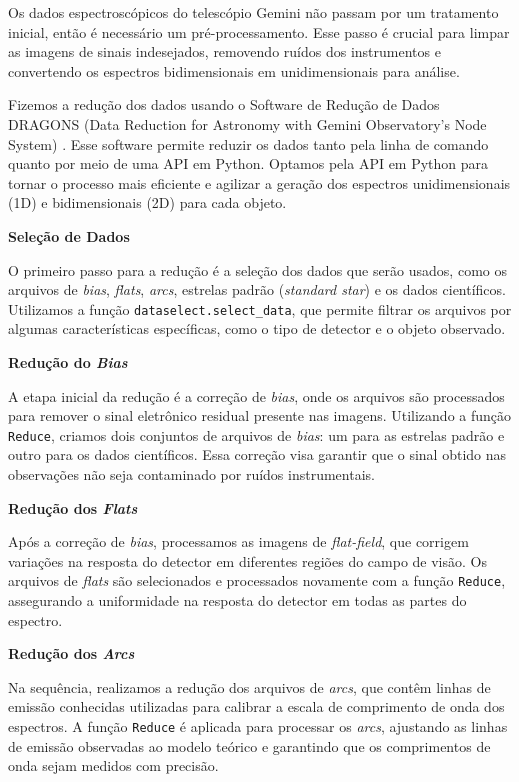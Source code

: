 Os dados espectroscópicos do telescópio Gemini não passam por um tratamento inicial, então é necessário um pré-processamento. Esse passo é crucial para limpar as imagens de sinais indesejados, removendo ruídos dos instrumentos e convertendo os espectros bidimensionais em unidimensionais para análise.

Fizemos a redução dos dados usando o Software de Redução de Dados DRAGONS (Data Reduction for Astronomy with Gemini Observatory's Node System) \cite{dragons_python}. Esse software permite reduzir os dados tanto pela linha de comando quanto por meio de uma API em Python. Optamos pela API em Python para tornar o processo mais eficiente e agilizar a geração dos espectros unidimensionais (1D) e bidimensionais (2D) para cada objeto.

\textbf{Seleção de Dados}

O primeiro passo para a redução é a seleção dos dados que serão usados, como os arquivos de \textit{bias}, \textit{flats}, \textit{arcs}, estrelas padrão (\textit{standard star}) e os dados científicos. Utilizamos a função \verb|dataselect.select_data|, que permite filtrar os arquivos por algumas características específicas, como o tipo de detector e o objeto observado.

\textbf{Redução do \textit{Bias}}

A etapa inicial da redução é a correção de \textit{bias}, onde os arquivos são processados para remover o sinal eletrônico residual presente nas imagens. Utilizando a função \verb|Reduce|, criamos dois conjuntos de arquivos de \textit{bias}: um para as estrelas padrão e outro para os dados científicos. Essa correção visa garantir que o sinal obtido nas observações não seja contaminado por ruídos instrumentais.

\textbf{Redução dos \textit{Flats}}

Após a correção de \textit{bias}, processamos as imagens de \textit{flat-field}, que corrigem variações na resposta do detector em diferentes regiões do campo de visão. Os arquivos de \textit{flats} são selecionados e processados novamente com a função \verb|Reduce|, assegurando a uniformidade na resposta do detector em todas as partes do espectro.

\textbf{Redução dos \textit{Arcs}}

Na sequência, realizamos a redução dos arquivos de \textit{arcs}, que contêm linhas de emissão conhecidas utilizadas para calibrar a escala de comprimento de onda dos espectros. A função \verb|Reduce| é aplicada para processar os \textit{arcs}, ajustando as linhas de emissão observadas ao modelo teórico e garantindo que os comprimentos de onda sejam medidos com precisão.

